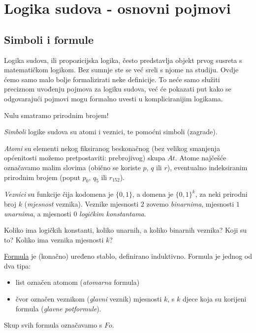 \chapter{Logika sudova - osnovni pojmovi}

\section{Simboli i formule}

Logika sudova, ili propozicijska logika, često predstavlja objekt prvog susreta s matematičkom logikom. Bez sumnje ste se već sreli s njome na studiju. Ovdje ćemo samo malo bolje formalizirati neke definicije. To neće samo služiti preciznom uvođenju pojmova za logiku sudova, već će pokazati put kako se odgovarajući pojmovi mogu formalno uvesti u kompliciranijim logikama.

\begin{napomena}Nulu smatramo prirodnim brojem!
\end{napomena}

\begin{definicija}
\emph{Simboli} logike sudova su atomi i veznici, te pomoćni simboli (zagrade).

\emph{Atomi} su elementi nekog fiksiranog beskonačnog (bez velikog smanjenja op\-će\-ni\-tos\-ti možemo pretpostaviti: prebrojivog) skupa $At$. Atome najčešće označavamo malim slovima (obično se koriste $p$, $q$ ili $r$), eventualno indeksiranim prirodnim brojem (poput $p_0$, $q_5$ ili $r_{152}$).

\emph{Veznici} su funkcije čija kodomena je $\{0,1\}$, a domena je $\{0,1\}^k$, za neki prirodni broj $k$ (\emph{mjesnost} veznika). Veznike mjesnosti $2$ zovemo \emph{binarnima}, mjesnosti $1$ \emph{unarnima}, a mjesnosti $0$ \emph{logičkim konstantama}.
\end{definicija}

\begin{zadatak}
Koliko ima logičkih konstanti, koliko unarnih, a koliko binarnih veznika? Koji su to? Koliko ima veznika mjesnosti $k$?
\end{zadatak}

\begin{definicija}
\underline{Formula} je (konačno) uređeno stablo, definirano induktivno. Formula je jednog od dva tipa:
\begin{itemize}
\item list označen atomom (\emph{atomarna} formula)
\item čvor označen veznikom (\emph{glavni} veznik) mjesnosti $k$, s $k$ djece koja su korijeni formula (\emph{glavne potformule}).
\end{itemize}
Skup svih formula označavamo s $Fo$.
\end{definicija}

